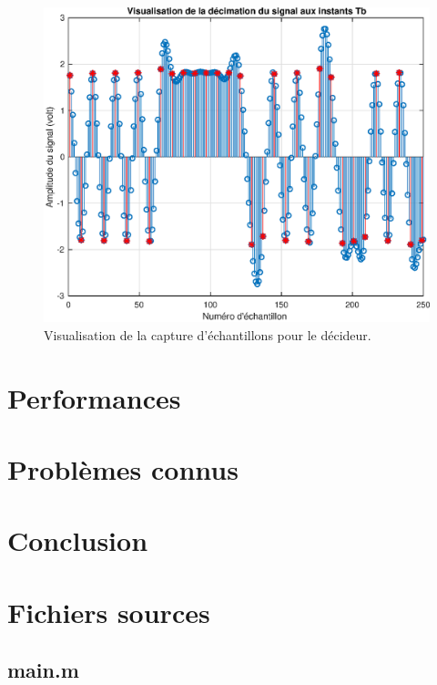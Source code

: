 \documentclass[10pt, oneside, a4paper]{article}
\begin{document}
\begin{figure}[p]
	\centering
	\includegraphics[height=0.45\textheight]{eps/decimate.eps}
	\caption{Visualisation de la capture d'échantillons pour le décideur.}
	\label{fig:decimate}
\end{figure}


\section{Performances}


\section{Problèmes connus}


\section{Conclusion}

\appendix
\clearpage

\section{Fichiers sources}
\label{sec:fichiers-sources}

\subsection{main.m}
\inputminted{matlab}{../main.m}
\label{app:main}
\end{document}
